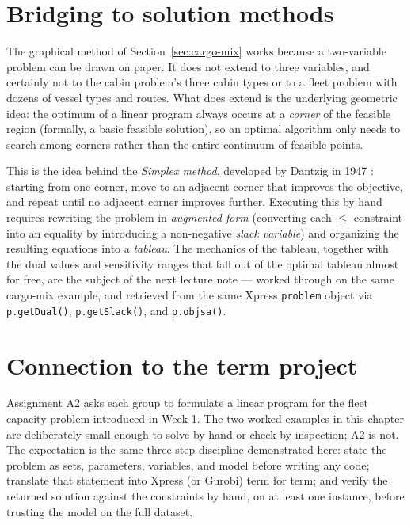 \section{Bridging to solution methods}
\label{sec:bridging}

The graphical method of Section~\ref{sec:cargo-mix} works because a
two-variable problem can be drawn on paper. It does not extend to three
variables, and certainly not to the cabin problem's three cabin types or
to a fleet problem with dozens of vessel types and routes. What does
extend is the underlying geometric idea: the optimum of a linear program
always occurs at a \emph{corner} of the feasible region (formally, a
basic feasible solution), so an optimal algorithm only needs to search
among corners rather than the entire continuum of feasible points.

This is the idea behind the \emph{Simplex method}, developed by
Dantzig in 1947 \citep{dantzig1963}: starting from one corner, move to an
adjacent corner that improves the objective, and repeat until no
adjacent corner improves further. Executing this by hand requires
rewriting the problem in \emph{augmented form} (converting each $\leq$
constraint into an equality by introducing a non-negative \emph{slack
variable}) and organizing the resulting equations into a \emph{tableau}.
The mechanics of the tableau, together with the dual values and
sensitivity ranges that fall out of the optimal tableau almost for free,
are the subject of the next lecture note — worked through on the same
cargo-mix example, and retrieved from the same Xpress \texttt{problem}
object via \texttt{p.getDual()}, \texttt{p.getSlack()}, and
\texttt{p.objsa()}.

\section{Connection to the term project}

Assignment A2 asks each group to formulate a linear program for the
fleet capacity problem introduced in Week 1. The two worked examples in
this chapter are deliberately small enough to solve by hand or check by
inspection; A2 is not. The expectation is the same three-step discipline
demonstrated here: state the problem as sets, parameters, variables, and
model before writing any code; translate that statement into Xpress (or
Gurobi) term for term; and verify the returned solution against the
constraints by hand, on at least one instance, before trusting the model
on the full dataset.

